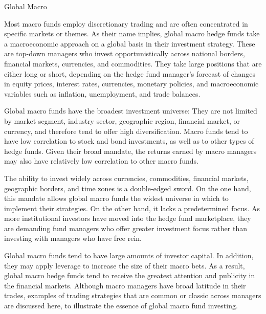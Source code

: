\documentclass[11pt]{article}
\begin{document}
Global Macro

Most macro funds employ discretionary trading and are often concentrated in specific markets or themes. As their name implies, global macro hedge funds take a macroeconomic approach on a global basis in their investment strategy. These are top-down managers who invest opportunistically across national borders, financial markets, currencies, and commodities. They take large positions that are either long or short, depending on the hedge fund manager's forecast of changes in equity prices, interest rates, currencies, monetary policies, and macroeconomic variables such as inflation, unemployment, and trade balances.

Global macro funds have the broadest investment universe: They are not limited by market segment, industry sector, geographic region, financial market, or currency, and therefore tend to offer high diversification. Macro funds tend to have low correlation to stock and bond investments, as well as to other types of hedge funds. Given their broad mandate, the returns earned by macro managers may also have relatively low correlation to other macro funds.

The ability to invest widely across currencies, commodities, financial markets, geographic borders, and time zones is a double-edged sword. On the one hand, this mandate allows global macro funds the widest universe in which to implement their strategies. On the other hand, it lacks a predetermined focus. As more institutional investors have moved into the hedge fund marketplace, they are demanding fund managers who offer greater investment focus rather than investing with managers who have free rein.

Global macro funds tend to have large amounts of investor capital. In addition, they may apply leverage to increase the size of their macro bets. As a result, global macro hedge funds tend to receive the greatest attention and publicity in the financial markets. Although macro managers have broad latitude in their trades, examples of trading strategies that are common or classic across managers are discussed here, to illustrate the essence of global macro fund investing.
\end{document}
